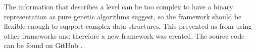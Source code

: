 \documentclass[sigconf]{acmart}
\begin{document}
The information that describes a level can be too complex to have a binary 
representation as pure genetic algorithms suggest, so the framework should be 
flexible enough to support complex data structures. This prevented us from using other 
frameworks
and therefore a new framework was created. The source  code can be found on GitHub \cite{ab-level}.





\end{document}
